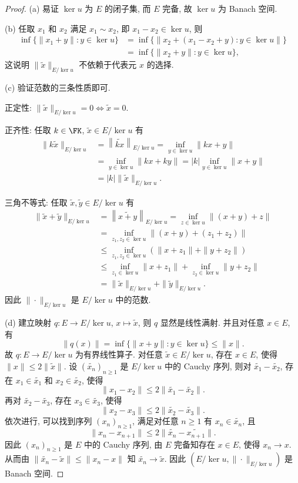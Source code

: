 \documentclass{mathexercise}
\begin{document}
\begin{proof}
    (a) 易证 $\ker u$ 为 $E$ 的闭子集, 而 $E$ 完备, 故 $\ker u$ 为 Banach 空间.

    (b) 任取 $x_1$ 和 $x_2$ 满足 $x_1\sim x_2$, 即 $x_1-x_2\in\ker u$, 则
    \begin{align*}
        \inf\{\|x_1+y\|\colon y\in\ker u\}
        &=\inf\{\|x_2+(x_1-x_2+y)\colon y\in\ker u\|\} \\
        &=\inf\{\|x_2+y\|\colon y\in\ker u\},
    \end{align*}
    这说明 $\|\tilde{x}\|_{E/\ker u}$ 不依赖于代表元 $x$ 的选择.

    (c) 验证范数的三条性质即可.

    正定性: $\|\tilde{x}\|_{E/\ker u}=0\iff\tilde{x}=0$.

    正齐性: 任取 $k\in\FK$, $\tilde{x}\in E/\ker u$ 有
    \begin{align*}
        \|k\tilde{x}\|_{E/\ker u}
        &=\left\|\widetilde{kx}\right\|_{E/\ker u}=\inf_{y\in\ker u}\|kx+y\| \\
        &=\inf_{y\in\ker u}\|kx+ky\|=|k|\inf_{y\in\ker u}\|x+y\| \\
        &=|k|\|\tilde{x}\|_{E/\ker u}.
    \end{align*}

    三角不等式: 任取 $\tilde{x},\tilde{y}\in E/\ker u$ 有
    \begin{align*}
        \|\tilde{x}+\tilde{y}\|_{E/\ker u}
        &=\left\|\widetilde{x+y}\right\|_{E/\ker u}=\inf_{z\in\ker u}\|(x+y)+z\| \\
        &=\inf_{z_1,z_2\in\ker u}\|(x+y)+(z_1+z_2)\| \\
        &\leq\inf_{z_1,z_2\in\ker u}(\|x+z_1\|+\|y+z_2\|) \\
        &\leq\inf_{z_1\in\ker u}\|x+z_1\|+\inf_{z_2\in\ker u}\|y+z_2\| \\
        &=\|\tilde{x}\|_{E/\ker u}+\|\tilde{y}\|_{E/\ker u}.
    \end{align*}
    因此 $\|\cdot\|_{E/\ker u}$ 是 $E/\ker u$ 中的范数.

    (d) 建立映射 $q:E\to E/\ker u$, $x\mapsto\tilde{x}$,
    则 $q$ 显然是线性满射. 并且对任意 $x\in E$, 有
    \[\|q(x)\|=\inf\{\|x+y\|\colon y\in\ker u\}\leq\|x\|.\]
    故 $q:E\to E/\ker u$ 为有界线性算子. 对任意 $\tilde{x}\in E/\ker u$,
    存在 $x\in E$, 使得 $\|x\|\leq 2\|\tilde{x}\|$.
    设 $(\widetilde{x_n})_{n\geq 1}$ 是 $E/\ker u$ 中的 Cauchy 序列,
    则对 $\widetilde{x_1}-\widetilde{x_2}$, 存在 $x_1\in\widetilde{x_1}$
    和 $x_2\in\widetilde{x_2}$, 使得
    \[\|x_1-x_2\|\leq 2\|\widetilde{x_1}-\widetilde{x_2}\|.\]
    再对 $\widetilde{x_2}-\widetilde{x_3}$, 存在 $x_3\in\widetilde{x_3}$, 使得
    \[\|x_2-x_3\|\leq 2\|\widetilde{x_2}-\widetilde{x_3}\|.\]
    依次进行, 可以找到序列 $(x_n)_{n\geq 1}$, 满足对任意 $n\geq 1$ 有
    $x_n\in\widetilde{x_n}$, 且
    \[\|x_n-x_{n+1}\|\leq 2\|\widetilde{x_n}-\widetilde{x_{n+1}}\|.\]
    因此 $(x_n)_{n\geq 1}$ 是 $E$ 中的 Cauchy 序列, 由 $E$ 完备知存在
    $x\in E$, 使得 $x_n\to x$.
    从而由 $\|\widetilde{x_n}-\widetilde{x}\|\leq\|x_n-x\|$
    知 $\widetilde{x_n}\to\tilde{x}$.
    因此 $(E/\ker u,\|\cdot\|_{E/\ker u})$ 是 Banach 空间.


\end{proof}
\end{document}
